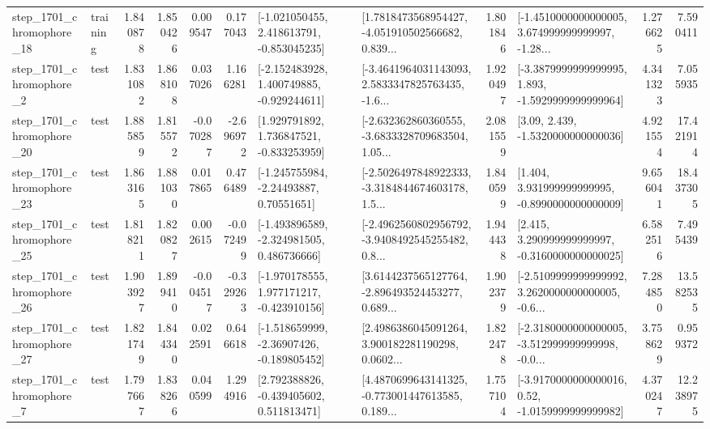 \begin{tabular}{llrrrrllrlrr}
 step\_1701\_chromophore\_18 &  training &      1.840878 &    1.850426 &      0.009547 &  0.177043 &   [-1.021050455, 2.418613791, -0.853045235] &  [1.7818473568954427, -4.051910502566682, 0.839... &       1.801846 &  [-1.4510000000000005, 3.674999999999997, -1.28... &            1.276625 &          7.590411 \\
  step\_1701\_chromophore\_2 &      test &      1.831082 &    1.868108 &      0.037026 &  1.166281 &   [-2.152483928, 1.400749885, -0.929244611] &  [-3.4641964031143093, 2.5833347825763435, -1.6... &       1.920497 &  [-3.3879999999999995, 1.893, -1.5929999999999964] &            4.341323 &          7.055935 \\
 step\_1701\_chromophore\_20 &      test &      1.885859 &    1.815572 &     -0.070287 & -2.696972 &    [1.929791892, 1.736847521, -0.833253959] &  [-2.632362860360555, -3.6833328709683504, 1.05... &       2.081559 &                 [3.09, 2.439, -1.5320000000000036] &            4.921554 &         17.421914 \\
 step\_1701\_chromophore\_23 &      test &      1.863165 &    1.881030 &      0.017865 &  0.476489 &     [-1.245755984, -2.24493887, 0.70551651] &  [-2.5026497848922333, -3.3184844674603178, 1.5... &       1.840599 &    [1.404, 3.931999999999995, -0.8990000000000009] &            9.656041 &         18.437305 \\
 step\_1701\_chromophore\_25 &      test &      1.818211 &    1.820827 &      0.002615 & -0.072499 &   [-1.493896589, -2.324981505, 0.486736666] &  [-2.4962560802956792, -3.9408492545255482, 0.8... &       1.944438 &    [2.415, 3.290999999999997, -0.3160000000000025] &            6.582516 &          7.495439 \\
 step\_1701\_chromophore\_26 &      test &      1.903927 &    1.899410 &     -0.004517 & -0.329263 &   [-1.970178555, 1.977171217, -0.423910156] &  [3.6144237565127764, -2.896493524453277, 0.689... &       1.902379 &  [-2.5109999999999992, 3.2620000000000005, -0.6... &            7.284850 &         13.582535 \\
 step\_1701\_chromophore\_27 &      test &      1.821749 &    1.844340 &      0.022591 &  0.646618 &   [-1.518659999, -2.36907426, -0.189805452] &  [2.4986386045091264, 3.900182281190298, 0.0602... &       1.822478 &  [-2.3180000000000005, -3.512999999999998, -0.0... &            3.758629 &          0.959372 \\
  step\_1701\_chromophore\_7 &      test &      1.797667 &    1.838266 &      0.040599 &  1.294916 &    [2.792388826, -0.439405602, 0.511813471] &  [4.4870699643141325, -0.773001447613585, 0.189... &       1.757104 &   [-3.9170000000000016, 0.52, -1.0159999999999982] &            4.370247 &         12.238975 \\

\end{tabular}
